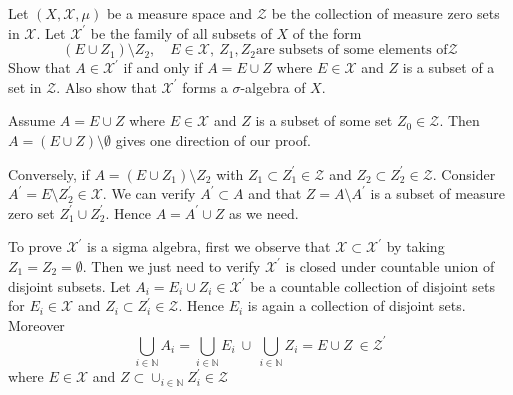 \begin{exercise}
	Let $(X, \mathcal{X}, \mu)$ be a measure space and $\mathcal{Z}$ be the collection of measure zero sets in $\mathcal{X}$. Let $\mathcal{ X}^\prime$ be the family of all subsets of $X$ of the form $$(E \cup Z_1)\setminus Z_2, \quad E \in \mathcal{X},\ Z_1, Z_2 \textrm{are subsets of some elements of} \mathcal{Z}$$
	Show that $A \in \mathcal{X}^\prime$ if and only if $ A  = E\cup Z$ where $E \in \mathcal{X}$ and $Z$ is a subset of a set in $\mathcal{Z}$. Also show that $\mathcal{X}^\prime$ forms a $\sigma$-algebra of $X$.
\end{exercise}
\begin{solution}
	Assume $A = E \cup Z$ where $E \in \mathcal{X}$ and $Z$ is a subset of some set $Z_0 \in \mathcal{ Z}$. Then $A = (E \cup Z) \setminus \emptyset$ gives one direction of our proof.

	Conversely, if $A = (E \cup Z_1) \setminus Z_2$ with $Z_1 \subset Z_1^\prime \in \mathcal{Z}$ and $Z_2 \subset Z_2^\prime \in \mathcal{Z}$. Consider $ A^\prime = E \setminus Z_2^\prime \in \mathcal{X}$. We can verify $A^\prime \subset A$ and that $Z = A \setminus A^\prime$ is a subset of measure zero set $Z_1^\prime \cup Z_2^\prime$. Hence $A = A^\prime\cup Z$ as we need.


	To prove $\mathcal{X}^\prime$ is a sigma algebra, first we observe that $\mathcal{X} \subset \mathcal{X}^\prime$ by taking $Z_1 = Z_2 = \emptyset$. Then we just need to verify  $\mathcal{X}^\prime$ is closed under countable union of disjoint subsets. Let $A_i = E_i \cup Z_i \in \mathcal{X}^\prime$ be a countable collection of disjoint sets for $E_i \in \mathcal{X}$ and $Z_i \subset Z_i^\prime \in \mathcal{Z}$. Hence $ E_i$ is again a collection of disjoint sets. Moreover $$\bigcup_{i \in \mathbb{N}} A_i = \bigcup_{i\in \mathbb{N}} E_i \ \cup \ \bigcup_{i \in \mathbb{N}} Z_i  = E \cup Z \ \in \mathcal{Z}^\prime$$
	where $  E \in \mathcal{X}$ and $Z \subset \cup_{i \in \mathbb{N}} Z_i^\prime \in \mathcal{Z}$
\end{solution}

